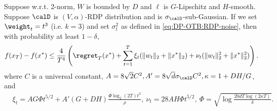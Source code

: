 \begin{theorem}
\label{thm:DP-OTB:parameter-free-2-norm-step-1}
Suppose w.r.t. 2-norm, $W$ is bounded by $D$ and $\ell$ is $G$-Lipschitz and $H$-smooth. Suppose $\calD$ is $(V,\alpha)$-RDP distribution and is $\sigma_\calD$-sub-Gaussian. If we set $\weight_t=t^3$ (i.e. $k=3$) and set $\sigma_t^2$ as defined in \eqref{eq:DP-OTB:RDP-noise}, then with probability at least $1-\delta$,
\begin{align*}
    f(x_T)-f(x^*) \leq \frac{4}{T^4}\left( \regret_T(x^*) + \sum_{t=1}^T \xi_t(\|w_t\|_2+\|x^*\|_2) + \nu_t(\|w_t\|_2^2+\|x^*\|_2^2) \right).
\end{align*}
where $C$ is a universal constant, $A=8\sqrt{2}C^2, A'=8\sqrt{d}\sigma_\calD C^2, \kappa=1+DH/G$, 
and
\begin{align*}
    &\xi_t = AG\Phi t^{5/2} + A'(G+DH)\frac{\Phi\log_2(2T)t^2}{\rho} , \
    \nu_t = 28AH\Phi t^{5/2}, \ 
    \Phi = \sqrt{\log\frac{20dT\log(2\kappa T)}{\delta}}.
\end{align*}
\end{theorem}
